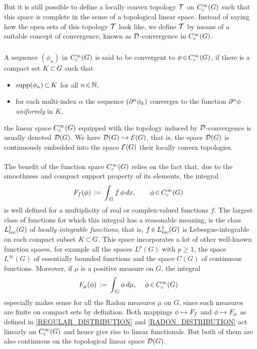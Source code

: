 \documentclass[11pt,twoside]{article}
\def\G{G}
\begin{document}
\subparagraph{}
But it is still possible to define a locally convex topology $\mathcal{T}$ on $\TF$
such that this space is complete in the sense of a topological linear space.
Instead of saying how the open sets of this topology $\mathcal{T}$ look like,
we define $\mathcal{T}$ by means of a suitable concept of convergence,
known as ${\mathcal{D}}$-convergence in $\TF$.

\subparagraph{}
A sequence $(\phi_n)$ in $\TF$ is said to be convergent to $\phi \xeof \TF$,
if there is a compact set $K \xsubset \G$
such that

\begin{itemize}[leftmargin=15mm]
\item[(D-1)]
$\operatorname{supp}(\phi_n) {\,\subset\,} K$ for all $n {\,\in\,} {\mathbb{N}}$,

\item[(D-2)]
for each multi-index $\alpha$ the sequence $(\partial^{\alpha} \phi_k)$
converges to the function $\partial^{\alpha} \phi$ \textit{uniformly} in $K$,
\end{itemize}
the linear space $\TF$ equipped with the topology
induced by ${\mathcal{D}}$-convergence is usually denoted $\D(\G)$.
We have $\D(\G) \hookrightarrow \E(\G)$,
that is,
the space $\D(\G)$ is continuously embedded into the space $\E(\G)$
{\wrt} their locally convex topologies.

\paragraph{} %
The benefit of the function space $\TF$ relies on the fact that,
due to the smoothness and compact support property of its elements,
the integral
\begin{equation}\label{REGULAR_DISTRIBUTION}
\disF_f(\phi) \, := \, \int_{\,\G} f \, \phi \, dx, \quad \quad \phi \xeof \TF
\end{equation}
is well defined for a multiplicity of real or complex-valued functions $f$.
The largest class of functions
for which this integral has a reasonable meaning,
is the class $\Lc$ of \textit{locally integrable functions},
that is,
$f \xeof \Lc$ is Lebesgue-integrable on each compact subset $K \xsubset \G$.
This space incorporates a lot of other well-known function spaces,
for example all the spaces $L^p(\G)$ with $p \geq 1$,
the space $L^{\infty}(\G)$ of essentially bounded functions
and the space $C(\G)$ of continuous functions.
Moreover, 
if $\mu$ is a positive measure on $\G$,
the integral
\begin{equation}\label{RADON_DISTRIBUTION}
\disF_{\mu}(\phi) \, := \, \int_{\,\G} \phi \, d\mu, \quad \, \phi \xeof \TF
\end{equation}
especially makes sense for all the Radon measures $\mu$ on $\G$,
since such measures are finite on compact sets by definition.
Both mappings $\phi \mapsto F_f$ and $\phi \mapsto F_{\mu}$
as defined in \eqref{REGULAR_DISTRIBUTION} and \eqref{RADON_DISTRIBUTION}
act linearly on $\TF$ and hence give rise to linear functionals.
But both of them are also continuous on the topological linear space $\D(\G)$.
\end{document}
